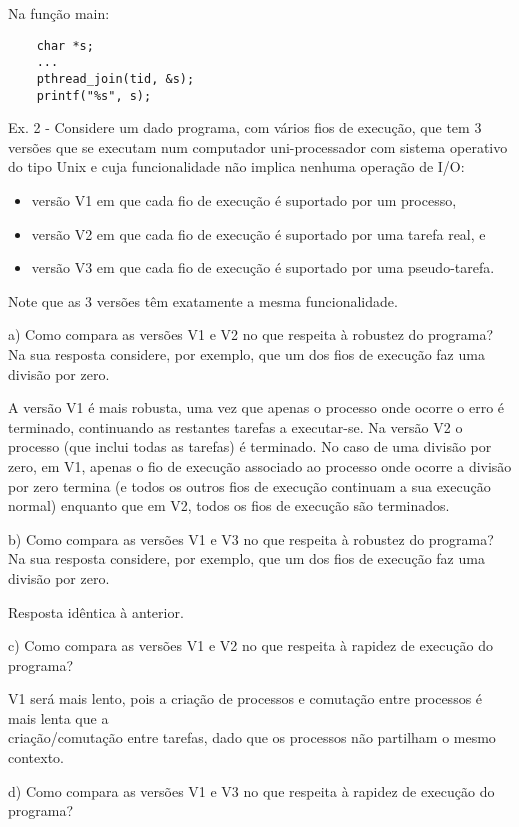 \documentclass[11pt]{article}
\begin{document}
Na função main:

\begin{lstlisting}
    char *s;
    ...
    pthread_join(tid, &s);
    printf("%s", s);
\end{lstlisting}


Ex. 2 - Considere um dado programa, com vários fios de execução, que tem 3 versões que se executam num computador uni-processador com sistema operativo do tipo Unix e cuja funcionalidade não implica nenhuma operação de I/O:
\begin{itemize}[topsep=0pt]
    \item versão V1 em que cada fio de execução é suportado por um processo,
    \item versão V2 em que cada fio de execução é suportado por uma tarefa real, e
    \item versão V3 em que cada fio de execução é suportado por uma pseudo-tarefa.
\end{itemize}

Note que as 3 versões têm exatamente a mesma funcionalidade.

a) Como compara as versões V1 e V2 no que respeita à robustez do programa? Na sua resposta considere, por exemplo, que um dos fios de execução faz uma divisão por zero.

A versão V1 é mais robusta, uma vez que apenas o processo onde ocorre o erro é terminado, continuando as restantes tarefas a executar-se. Na versão V2 o processo (que inclui todas as tarefas) é terminado. No caso de uma divisão por zero, em V1, apenas o fio de execução associado ao processo onde ocorre a divisão por zero termina (e todos os outros fios de execução continuam a sua execução normal) enquanto que em V2, todos os fios de execução são terminados.

b) Como compara as versões V1 e V3 no que respeita à robustez do programa? Na sua resposta considere, por exemplo, que um dos fios de execução faz uma divisão por zero.

Resposta idêntica à anterior.

c) Como compara as versões V1 e V2 no que respeita à rapidez de execução do programa?

V1 será mais lento, pois a criação de processos e comutação entre processos é mais lenta que a \\ criação/comutação entre tarefas, dado que os processos não partilham o mesmo contexto.

d) Como compara as versões V1 e V3 no que respeita à rapidez de execução do programa?
\end{document}
